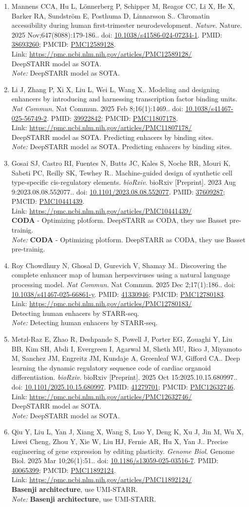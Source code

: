 \documentclass[12pt]{article}
\newcommand{\Pub}[9]{%
  \item #1. #2. \textit{#3}. #4. doi: \href{https://doi.org/#5}{#5}. PMID: \href{https://pubmed.ncbi.nlm.nih.gov/#6/}{#6}; PMCID: \href{https://www.ncbi.nlm.nih.gov/pmc/articles/#7/}{#7}. \\
  \noindent Link: \url{#8}\\
  \ifx#9\relax\else\\\textit{Note:} #9\fi
}
\begin{document}
\begin{enumerate}[leftmargin=*,label=\textbf{\arabic*.}]
\Pub{Mannens CCA, Hu L, Lönnerberg P, Schipper M, Reagor CC, Li X, He X, Barker RA, Sundström E, Posthuma D, Linnarsson S.}{Chromatin accessibility during human first-trimester neurodevelopment}{Nature}{Nature. 2025 Nov;647(8088):179-186.}{10.1038/s41586-024-07234-1}{38693260}{PMC12589128}{https://pmc.ncbi.nlm.nih.gov/articles/PMC12589128/}{DeepSTARR model as SOTA.}

\Pub{Li J, Zhang P, Xi X, Liu L, Wei L, Wang X.}{Modeling and designing enhancers by introducing and harnessing transcription factor binding units}{Nat Commun}{Nat Commun. 2025 Feb 8;16(1):1469.}{10.1038/s41467-025-56749-2}{39922842}{PMC11807178}{https://pmc.ncbi.nlm.nih.gov/articles/PMC11807178/}{DeepSTARR model as SOTA. Predicting enhacers by binding sites.}

\newpage

\Pub{Gosai SJ, Castro RI, Fuentes N, Butts JC, Kales S, Noche RR, Mouri K, Sabeti PC, Reilly SK, Tewhey R.}{Machine-guided design of synthetic cell type-specific cis-regulatory elements}{bioRxiv}{bioRxiv [Preprint]. 2023 Aug 9:2023.08.08.552077.}{10.1101/2023.08.08.552077}{37609287}{PMC10441439}{https://pmc.ncbi.nlm.nih.gov/articles/PMC10441439/}{\textbf{CODA} - Optimizing plotform. DeepSTARR as CODA, they use Basset pre-trainig.}

\Pub{Roy Chowdhury N, Ghosal D, Gurevich V, Shamay M.}{Discovering the complete enhancer map of human herpesviruses using a natural language processing model}{Nat Commun}{Nat Commun. 2025 Dec 2;17(1):186.}{10.1038/s41467-025-66861-y}{41330946}{PMC12780183}{https://pmc.ncbi.nlm.nih.gov/articles/PMC12780183/}{Detecting human enhacers by STARR-seq.}

\Pub{Metzl-Raz E, Zhao R, Deshpande S, Powell J, Porter EG, Zouaghi Y, Liu BB, Kim SH, Abdi I, Evergreen I, Agarwal M, Sheth MU, Rico J, Miyamoto M, Sanchez JM, Engreitz JM, Kundaje A, Greenleaf WJ, Gifford CA.}{Deep learning the dynamic regulatory sequence code of cardiac organoid differentiation}{bioRxiv}{bioRxiv [Preprint]. 2025 Oct 15:2025.10.15.680997.}{10.1101/2025.10.15.680997}{41279701}{PMC12632746}{https://pmc.ncbi.nlm.nih.gov/articles/PMC12632746/}{DeepSTARR model as SOTA.}

\Pub{Qiu Y, Liu L, Yan J, Xiang X, Wang S, Luo Y, Deng K, Xu J, Jin M, Wu X, Liwei Cheng, Zhou Y, Xie W, Liu HJ, Fernie AR, Hu X, Yan J.}{Precise engineering of gene expression by editing plasticity}{Genome Biol}{Genome Biol. 2025 Mar 10;26(1):51.}{10.1186/s13059-025-03516-7}{40065399}{PMC11892124}{https://pmc.ncbi.nlm.nih.gov/articles/PMC11892124/}{\textbf{Basenji architecture}, use UMI-STARR.}


\end{enumerate}
\end{document}
